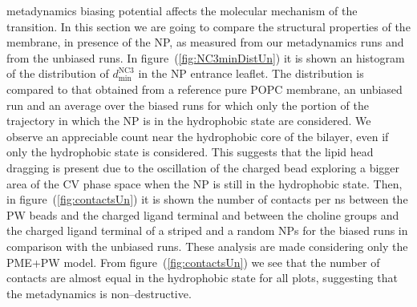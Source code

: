metadynamics biasing potential affects the molecular mechanism of the transition. In this section we are going to compare the structural properties of the membrane, in presence of the \ac{NP}, as measured from our metadynamics runs and from the unbiased runs. In figure~(\ref{fig:NC3minDistUn}) it is shown an histogram of the distribution of $d_\text{min}^{\text{NC}3}$ in the \ac{NP} entrance leaflet. The distribution is compared to that obtained from a reference pure \ac{POPC} membrane, an unbiased run and an average over the biased runs for which only the portion of the trajectory in which the \ac{NP} is in the hydrophobic state are considered. We observe an appreciable count near the hydrophobic core of the bilayer, even if only the hydrophobic state is considered. This suggests that the lipid head dragging is present due to the oscillation of the charged bead exploring a bigger area of the \ac{CV} phase space when the \ac{NP} is still in the hydrophobic state. Then, in figure~(\ref{fig:contactsUn}) it is shown the number of contacts per ns between the \ac{PW} beads and the charged ligand terminal and between the choline groups and the charged ligand terminal of a striped and a random \acp{NP} for the biased runs in comparison with the unbiased runs. These analysis are made considering only the \ac{PME}+\ac{PW} model. From figure~(\ref{fig:contactsUn}) we see that the number of contacts are almost equal in the hydrophobic state for all plots, suggesting that the metadynamics is non--destructive.
